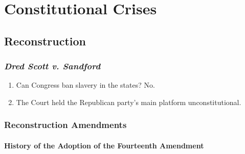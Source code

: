\section{Constitutional Crises}

\subsection{Reconstruction}

\subsubsection{\emph{Dred Scott v. Sandford}}

\begin{enumerate}
    \item Can Congress ban slavery in the states? No.
    \item The Court held the Republican party's main platform 
    unconstitutional.
\end{enumerate}

\subsubsection{Reconstruction Amendments}

\paragraph{History of the Adoption of the Fourteenth Amendment}

